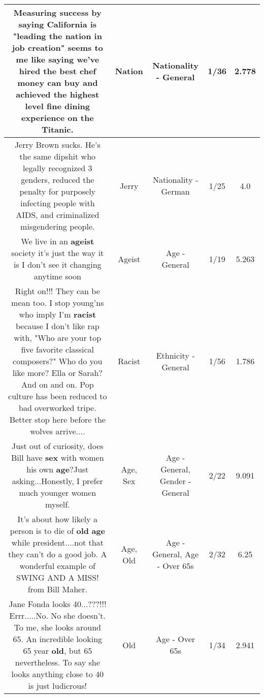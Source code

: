 \documentclass[11pt]{article}
\newlength\mylength
\begin{document}
\begin{center}
\begin{longtable}{|C{.65\mylength}|C{.30\mylength}|C{.12\mylength}|C{.12\mylength}|C{.12\mylength}|}
  \small Measuring success by saying California is "leading the \textbf{nation} in job creation" seems to me like saying we've hired the best chef money can buy and achieved the highest level fine dining experience on the Titanic.\normalsize   & Nation & Nationality - General & 1/36 & 2.778 \\  \hline
  \small Jerry Brown sucks. He's the same dipshit who legally recognized 3 genders, reduced the penalty for purposely infecting people with AIDS, and criminalized misgendering people.\normalsize   & Jerry & Nationality - German & 1/25 & 4.0 \\  \hline
  \small We live in an \textbf{ageist} society it's just the way it is I don't see it changing anytime soon\normalsize   & Ageist & Age - General & 1/19 & 5.263 \\  \hline
  \small Right on!!! They can be mean too. I stop young'ns who imply I'm \textbf{racist} because I don't like rap with, "Who are your top five favorite classical composers?" Who do you like more? Ella or Sarah? And on and on. Pop culture has been reduced to bad overworked tripe. Better stop here before the wolves arrive....\normalsize   & Racist & Ethnicity - General & 1/56 & 1.786 \\  \hline
  \small Just out of curiosity, does Bill have \textbf{sex} with women his own \textbf{age}?Just asking...Honestly, I prefer much younger women myself.\normalsize   & Age, Sex & Age - General, Gender - General & 2/22 & 9.091 \\  \hline
  \small It's  about how likely a person is to die of \textbf{old} \textbf{age} while president....not that they can't do a good job. A wonderful example of SWING AND A MISS! from Bill Maher.\normalsize   & Age, Old & Age - General, Age - Over 65s & 2/32 & 6.25 \\  \hline
  \small Jane Fonda looks 40...???!!! Errr.....No. No she doesn't.  To me,  she looks around 65.  An incredible looking 65 year \textbf{old}, but 65 nevertheless.  To say she looks anything close to 40 is just ludicrous!\normalsize   & Old & Age - Over 65s & 1/34 & 2.941 \\  \hline

\end{longtable}
\end{center}
\end{document}
